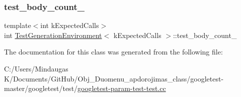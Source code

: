 \mbox{\label{class_test_generation_environment_a7d1ce26e381894b72d2ca7f4630914fa}} 
\subsubsection{\texorpdfstring{test\_body\_count\_}{test\_body\_count\_}}
{\footnotesize\ttfamily template$<$int k\+Expected\+Calls$>$ \\
int \mbox{\hyperlink{class_test_generation_environment}{Test\+Generation\+Environment}}$<$ k\+Expected\+Calls $>$\+::test\+\_\+body\+\_\+count\+\_\+\hspace{0.3cm}{\ttfamily [private]}}



The documentation for this class was generated from the following file\+:\begin{DoxyCompactItemize}
\item 
C\+:/\+Users/\+Mindaugas K/\+Documents/\+Git\+Hub/\+Obj\+\_\+\+Duomenu\+\_\+apdorojimas\+\_\+class/googletest-\/master/googletest/test/\mbox{\hyperlink{googletest-master_2googletest_2test_2googletest-param-test-test_8cc}{googletest-\/param-\/test-\/test.\+cc}}\end{DoxyCompactItemize}

